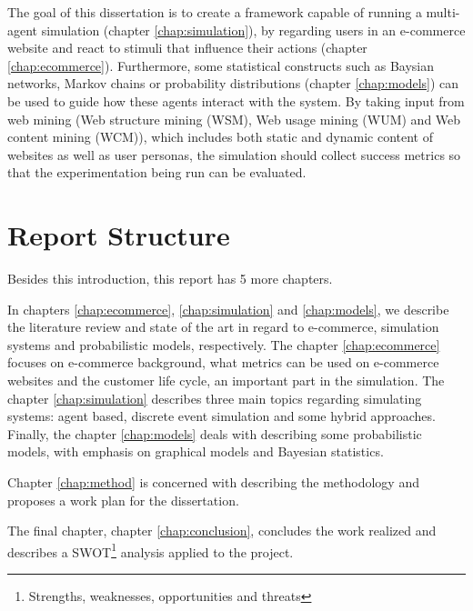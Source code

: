 The goal of this dissertation is to create a framework capable of running a
multi-agent simulation (chapter \ref{chap:simulation}), by regarding users in 
an e-commerce website and react to stimuli that influence their actions 
(chapter \ref{chap:ecommerce}). Furthermore, some statistical constructs such 
as Baysian networks, Markov chains or probability distributions (chapter 
\ref{chap:models}) can be used to guide how these agents interact with the 
system. By taking input from web mining (Web structure mining (WSM), Web usage 
mining (WUM) and Web content mining (WCM)), which includes both static and 
dynamic content of websites as well as user personas, the simulation should 
collect success metrics so that the experimentation being run can be evaluated.

\section{Report Structure} \label{sec:struct}

Besides this introduction, this report has 5 more chapters.

In chapters \ref{chap:ecommerce}, \ref{chap:simulation} and \ref{chap:models}, 
we describe the literature review and state of the art in regard to e-commerce, 
simulation systems and probabilistic models, respectively. The chapter 
\ref{chap:ecommerce} focuses on e-commerce background, what metrics can be used 
on e-commerce websites and the customer life cycle, an important part in the 
simulation. The chapter \ref{chap:simulation} describes three main topics 
regarding simulating systems: agent based, discrete event simulation and some 
hybrid approaches. Finally, the chapter \ref{chap:models} deals with describing 
some probabilistic models, with emphasis on graphical models and Bayesian 
statistics.

Chapter \ref{chap:method} is concerned with describing the methodology and 
proposes a work plan for the dissertation.

The final chapter, chapter \ref{chap:conclusion}, concludes the work realized 
and describes a SWOT\footnote{Strengths, weaknesses, opportunities and threats} 
analysis applied to the project.
